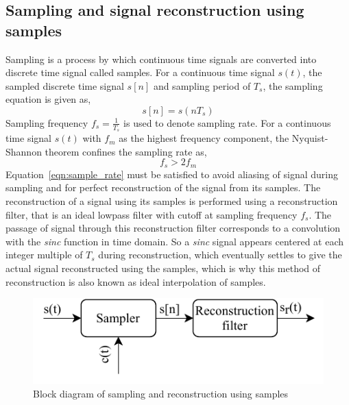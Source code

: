 \documentclass{lab_sheet}
\newcommand\ddfrac[2]{\frac{\displaystyle #1}{\displaystyle #2}}
\begin{document}
\subsection{Sampling and signal reconstruction using samples}
Sampling is a process by which continuous time signals are converted into discrete time signal called samples. For a continuous time signal $s(t)$, the sampled discrete time signal $s[n]$ and sampling period of $T_s$, the sampling equation is given as,
\begin{equation}
    s[n]=s(nT_s)
\end{equation}
Sampling frequency $f_s=\ddfrac{1}{T_s}$ is used to denote sampling rate. For a continuous time signal $s(t)$ with $f_m$ as the highest frequency component, the Nyquist-Shannon theorem confines the sampling rate as,
\begin{equation}
    f_s>2f_m
    \label{eqn:sample_rate}
\end{equation}
Equation~\ref{eqn:sample_rate} must be satisfied to avoid aliasing of signal during sampling and for perfect reconstruction of the signal from its samples. The reconstruction of a signal using its samples is performed using a reconstruction filter, that is an ideal lowpass filter with cutoff at sampling frequency $f_s$. The passage of signal through this reconstruction filter corresponds to a convolution with the \textit{sinc} function in time domain. So a \textit{sinc} signal appears centered at each integer multiple of $T_s$ during reconstruction, which eventually settles to give the actual signal reconstructed using the samples, which is why this method of reconstruction is also known as ideal interpolation of samples.
\begin{figure}[H]
    \centering
    \includegraphics{../Figures/sample_block}
    \caption{Block diagram of sampling and reconstruction using samples}
    \label{fig:sample_block}
\end{figure}
\end{document}
